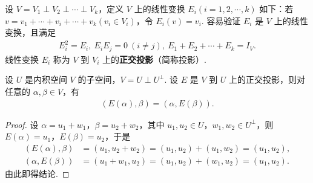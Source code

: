 \documentclass[../../main.tex]{subfiles}
\begin{document}
\begin{definition}[正交投影]
设 $V = V_1 \perp V_2 \perp \cdots \perp V_k$，定义 $V$ 上的线性变换 $E_i (i = 1, 2, \cdots, k)$ 如下：若 $v = v_1 + \cdots + v_i + \cdots + v_k (v_i \in V_i)$，令 $E_i(v) = v_i$. 容易验证 $E_i$ 是 $V$ 上的线性变换，且满足
\begin{align*}
E_i^2 = E_i, \ E_iE_j = 0\ (i \neq j), \ E_1 + E_2 + \cdots + E_k = I_V.
\end{align*}
线性变换 $E_i$ 称为 $V$ 到 $V_i$ 上的\textbf{正交投影}（简称投影）.
\end{definition}

\begin{proposition}\label{proposition:正交投影的性质}
设 $U$ 是内积空间 $V$ 的子空间，$V = U \perp U^\perp$. 设 $E$ 是 $V$ 到 $U$ 上的正交投影，则对任意的 $\alpha, \beta \in V$，有
\begin{align*}
(E(\alpha), \beta) = (\alpha, E(\beta)).
\end{align*}
\end{proposition}
\begin{proof}
设 $\alpha = u_1 + w_1$，$\beta = u_2 + w_2$，其中 $u_1, u_2 \in U$，$w_1, w_2 \in U^\perp$，则 $E(\alpha) = u_1$，$E(\beta) = u_2$，于是
\begin{align*}
(E(\alpha), \beta) &= (u_1, u_2 + w_2) = (u_1, u_2) + (u_1, w_2) = (u_1, u_2), \\
(\alpha, E(\beta)) &= (u_1 + w_1, u_2) = (u_1, u_2) + (w_1, u_2) = (u_1, u_2).
\end{align*}
由此即得结论.
\end{proof}
\end{document}
